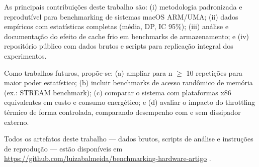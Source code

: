 \documentclass[12pt]{article}
\begin{document}
As principais contribui\c{c}\~oes deste trabalho s\~ao: (i) metodologia
padronizada e reprodut\'ivel para benchmarking de sistemas macOS ARM/UMA;
(ii) dados emp\'iricos com estat\'isticas completas (m\'edia, DP, IC 95\%);
(iii) an\'alise e documenta\c{c}\~ao do efeito de cache frio em benchmarks
de armazenamento; e (iv) reposit\'orio p\'ublico com dados brutos e scripts
para replica\c{c}\~ao integral dos experimentos.

Como trabalhos futuros, prop\~oe-se: (a) ampliar para n $\geq$ 10 repeti\c{c}\~oes
para maior poder estat\'istico; (b) incluir benchmarks de acesso rand\^omico
de mem\'oria (ex.: STREAM benchmark); (c) comparar o sistema com plataformas
x86 equivalentes em custo e consumo energ\'etico; e (d) avaliar o impacto
do throttling t\'ermico de forma controlada, comparando desempenho com e sem
dissipador externo.

Todos os artefatos deste trabalho --- dados brutos, scripts de an\'alise e
instru\c{c}\~oes de reprodu\c{c}\~ao --- est\~ao disponíveis em
\url{https://github.com/luizabalmeida/benchmarking-hardware-artigo}
\cite{github2025repo}.




\end{document}
